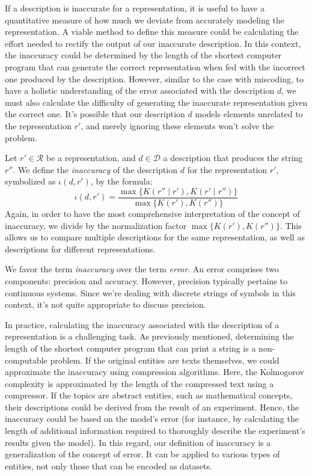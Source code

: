 If a description is inaccurate for a representation, it is useful to have a quantitative measure of how much we deviate from accurately modeling the representation. A viable method to define this measure could be calculating the effort needed to rectify the output of our inaccurate description. In this context, the inaccuracy could be determined by the length of the shortest computer program that can generate the correct representation when fed with the incorrect one produced by the description. However, similar to the case with miscoding, to have a holistic understanding of the error associated with the description $d$, we must also calculate the difficulty of generating the inaccurate representation given the correct one. It's possible that our description $d$ models elements unrelated to the representation $r'$, and merely ignoring these elements won't solve the problem.

Let $r' \in \mathcal{R}$ be a representation, and $d \in \mathcal{D}$ a description that produces the string $r''$. We define the \emph{inaccuracy} of the description $d$ for the representation $r'$, symbolized as $\iota(d, r')$, by the formula:
\[
\iota(d, r') = \frac{ \max\{ K(r'' \mid r'), K(r' \mid r'') \} } { \max\{ K(r'), K(r'') \} }
\]
Again, in order to have the most comprehensive interpretation of the concept of inaccuracy, we divide by the normalization factor $\max\{ K(r'), K(r'') \}$. This allows us to compare multiple descriptions for the same representation, as well as descriptions for different representations.

We favor the term \emph{inaccuracy} over the term \emph{error}. An error comprises two components: precision and accuracy. However, precision typically pertains to continuous systems. Since we're dealing with discrete strings of symbols in this context, it's not quite appropriate to discuss precision.

In practice, calculating the inaccuracy associated with the description of a representation is a challenging task. As previously mentioned, determining the length of the shortest computer program that can print a string is a non-computable problem. If the original entities are texts themselves, we could approximate the inaccuracy using compression algorithms. Here, the Kolmogorov complexity is approximated by the length of the compressed text using a compressor. If the topics are abstract entities, such as mathematical concepts, their descriptions could be derived from the result of an experiment. Hence, the inaccuracy could be based on the model's error (for instance, by calculating the length of additional information required to thoroughly describe the experiment's results given the model). In this regard, our definition of inaccuracy is a generalization of the concept of error. It can be applied to various types of entities, not only those that can be encoded as datasets.

